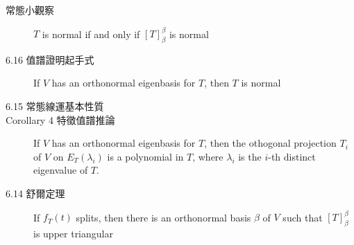 \documentclass[9pt, twocolumn]{extarticle}
\begin{document}
\begin{description}
    \item[常態小觀察] $T$ is normal if and only if $[ T ]_{\beta}^{\beta}$ is normal
    \item[6.16 值譜證明起手式] If $V$ has an orthonormal eigenbasis for $T$, then $T$ is normal
    \item[6.15 常態線運基本性質]
    \item[Corollary 4 特徵值譜推論] If $V$ has an orthonormal eigenbasis for $T$, then the othogonal projection $T_i$ of $V$ on $E_T(\lambda_i)$ is a polynomial in $T$, where $\lambda_i$ is the $i$-th distinct eigenvalue of $T$.
    \item[6.14 舒爾定理] If $f_T(t)$ splits, then there is an orthonormal basis $\beta$ of $V$ such that $[T]_{\beta}^{\beta}$ is upper triangular
        
\end{description}
\end{document}
